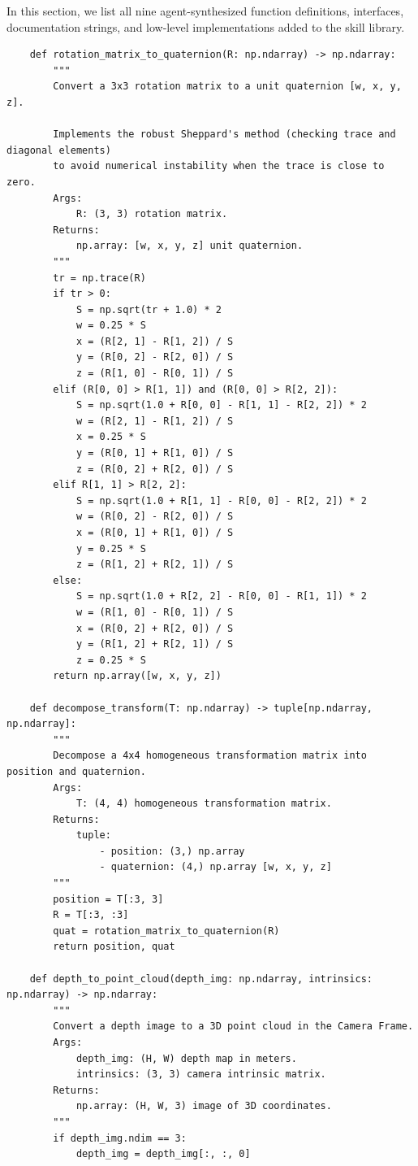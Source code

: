 In this section, we list all nine agent-synthesized function definitions, interfaces, documentation strings, and low-level implementations added to the \sysname{} skill library.

\begin{lstlisting}
    def rotation_matrix_to_quaternion(R: np.ndarray) -> np.ndarray:
        """
        Convert a 3x3 rotation matrix to a unit quaternion [w, x, y, z].

        Implements the robust Sheppard's method (checking trace and diagonal elements)
        to avoid numerical instability when the trace is close to zero.
        Args:
            R: (3, 3) rotation matrix.
        Returns:
            np.array: [w, x, y, z] unit quaternion.
        """
        tr = np.trace(R)
        if tr > 0:
            S = np.sqrt(tr + 1.0) * 2
            w = 0.25 * S
            x = (R[2, 1] - R[1, 2]) / S
            y = (R[0, 2] - R[2, 0]) / S
            z = (R[1, 0] - R[0, 1]) / S
        elif (R[0, 0] > R[1, 1]) and (R[0, 0] > R[2, 2]):
            S = np.sqrt(1.0 + R[0, 0] - R[1, 1] - R[2, 2]) * 2
            w = (R[2, 1] - R[1, 2]) / S
            x = 0.25 * S
            y = (R[0, 1] + R[1, 0]) / S
            z = (R[0, 2] + R[2, 0]) / S
        elif R[1, 1] > R[2, 2]:
            S = np.sqrt(1.0 + R[1, 1] - R[0, 0] - R[2, 2]) * 2
            w = (R[0, 2] - R[2, 0]) / S
            x = (R[0, 1] + R[1, 0]) / S
            y = 0.25 * S
            z = (R[1, 2] + R[2, 1]) / S
        else:
            S = np.sqrt(1.0 + R[2, 2] - R[0, 0] - R[1, 1]) * 2
            w = (R[1, 0] - R[0, 1]) / S
            x = (R[0, 2] + R[2, 0]) / S
            y = (R[1, 2] + R[2, 1]) / S
            z = 0.25 * S
        return np.array([w, x, y, z])

    def decompose_transform(T: np.ndarray) -> tuple[np.ndarray, np.ndarray]:
        """
        Decompose a 4x4 homogeneous transformation matrix into position and quaternion.
        Args:
            T: (4, 4) homogeneous transformation matrix.
        Returns:
            tuple:
                - position: (3,) np.array
                - quaternion: (4,) np.array [w, x, y, z]
        """
        position = T[:3, 3]
        R = T[:3, :3]
        quat = rotation_matrix_to_quaternion(R)
        return position, quat

    def depth_to_point_cloud(depth_img: np.ndarray, intrinsics: np.ndarray) -> np.ndarray:
        """
        Convert a depth image to a 3D point cloud in the Camera Frame.
        Args:
            depth_img: (H, W) depth map in meters.
            intrinsics: (3, 3) camera intrinsic matrix.
        Returns:
            np.array: (H, W, 3) image of 3D coordinates.
        """
        if depth_img.ndim == 3:
            depth_img = depth_img[:, :, 0]


\end{lstlisting}
